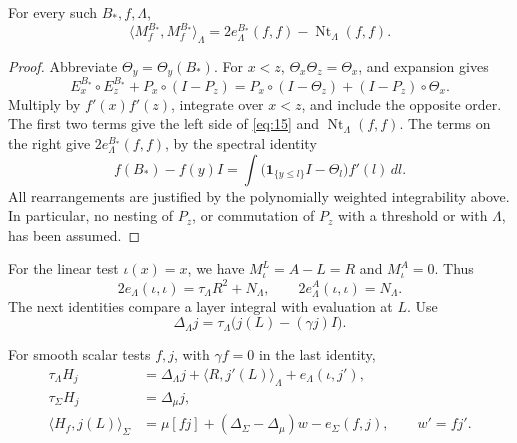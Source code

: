\begin{lemma}\label{lem:threshold-defect}
 For every such \(B_*,f,\Lambda\),
 \begin{equation}\tag{15}\label{eq:15}
  \langle M_f^{B_*},M_f^{B_*}\rangle_\Lambda
    =2e_\Lambda^{B_*}(f,f)-\operatorname{Nt}_\Lambda(f,f).
 \end{equation}
\end{lemma}

\begin{proof}
Abbreviate \(\Theta_y=\Theta_y(B_*)\). For \(x<z\),
\(\Theta_x\Theta_z=\Theta_x\), and expansion gives
\[
 E_x^{B_*}\circ E_z^{B_*}+P_x\circ(I-P_z)
   =P_x\circ(I-\Theta_z)+(I-P_z)\circ\Theta_x.
\]
Multiply by \(f'(x)f'(z)\), integrate over \(x<z\), and include the
opposite order. The first two terms give the left side of
\eqref{eq:15} and \(\operatorname{Nt}_\Lambda(f,f)\).
The terms on the right give \(2e_\Lambda^{B_*}(f,f)\), by the
spectral identity
\[
 f(B_*)-f(y)I
   =\int\bigl(\mathbf1_{\{y\leq l\}}I-\Theta_l\bigr)f'(l)\,dl.
\]
All rearrangements are justified by the polynomially weighted
integrability above. In particular, no nesting of \(P_z\), or
commutation of \(P_z\) with a threshold or with \(\Lambda\), has
been assumed.
\end{proof}

For the linear test \(\iota(x)=x\), we have
\(M_\iota^L=A-L=R\) and \(M_\iota^A=0\). Thus
\[
 2e_\Lambda(\iota,\iota)=\tau_\Lambda R^2+N_\Lambda,\qquad
 2e_\Lambda^A(\iota,\iota)=N_\Lambda.
\]
The next identities compare a layer integral with evaluation at \(L\).
Use
\[
 \Delta_\Lambda j=\tau_\Lambda\bigl(j(L)-(\gamma j)I\bigr).
\]

\begin{lemma}\label{lem:layer-spectral}
 For smooth scalar tests \(f,j\), with \(\gamma f=0\) in the last
 identity,
 \begin{equation}\tag{16}\label{eq:16}
 \begin{aligned}
  \tau_\Lambda H_j
   &=\Delta_\Lambda j+\langle R,j'(L)\rangle_\Lambda
                         +e_\Lambda(\iota,j'),\\
  \tau_\Sigma H_j&=\Delta_\mu j,\\
  \langle H_f,j(L)\rangle_\Sigma
   &=\mu[fj]+(\Delta_\Sigma-\Delta_\mu)w-e_\Sigma(f,j),
       \qquad w'=fj'.
 \end{aligned}
 \end{equation}
\end{lemma}

